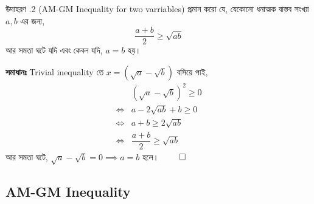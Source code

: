 \documentclass[12pt]{article}
\begin{document}
\begin{exam} {উদাহরণ \thesubsubsection.2 (AM-GM Inequality for two varriables)}
    প্রমান করো যে, যেকোনো ধনাত্মক বাস্তব সংখ্যা $a, b$ এর জন্য, 
    $$\dfrac{a+b}{2} \geq \sqrt{ab}$$
    আর সমতা ঘটে যদি এবং কেবল যদি, $a = b$ হয়। 
\end{exam}
\begin{sol}
    \textbf{সমাধানঃ} Trivial inequality তে $x = (\sqrt a - \sqrt b)$ বসিয়ে পাই,
    \begin{align*}
        & (\sqrt a - \sqrt b)^2 \geq 0\\
        \iff & a - 2\sqrt{ab} +b \geq 0\\
        \iff &  a + b \geq 2\sqrt{ab}\\
        \iff & \dfrac{a+b}{2} \geq \sqrt{ab}
    \end{align*}
    আর সমতা ঘটে, $\sqrt a - \sqrt b = 0 \implies a = b$ হলে। $\qed$ 
\end{sol}



\subsection{AM-GM Inequality}
\end{document}

